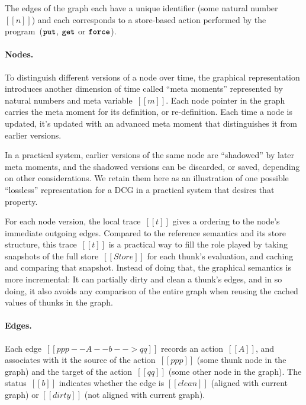\documentclass[11pt]{article}
\renewcommand{\ottkw}[1]{\textbf{\texttt{#1}}}
\begin{document}
The edges of the graph each have a unique identifier (some natural number~$[[n]]$) and each corresponds to a store-based action performed by the program~($\ottkw{put}$, $\ottkw{get}$ or $\ottkw{force}$).

\ottgrammartabular{
  \ottGraph
}


\ottgrammartabular{
  \ottppp
}

\paragraph{Nodes.}
To distinguish different versions of a node over time,
the graphical representation introduces another dimension of time called ``meta moments''
represented by natural numbers and meta variable~$[[m]]$.
%
Each node pointer in the graph carries the meta moment for its definition, or re-definition.
%
Each time a node is updated, it's updated with an advanced meta moment that distinguishes it from earlier versions.

In a practical system, earlier versions of the same node are
``shadowed'' by later meta moments, and the shadowed versions can be
discarded, or saved, depending on other considerations.
%
We retain them here as an illustration of one possible ``lossless'' representation for a DCG in a practical system that desires that property.

For each node version, the local trace~$[[t]]$ gives a ordering to the node's immediate outgoing edges.
%
Compared to the reference semantics and its store structure, this
trace~$[[t]]$ is a practical way to fill the role played by taking
snapshots of the full store~$[[Store]]$ for each thunk's evaluation,
and caching and comparing that snapshot.
%
Instead of doing that, the graphical semantics is more incremental:
It can partially dirty and clean a thunk's edges, and in so doing, it also avoids any comparison of the entire graph
when reusing the cached values of thunks in the graph.

\ottgrammartabular{
  \ottnode
  \\
  \ottcache
  \\
  \ottt
}

\paragraph{Edges.}
Each edge~$[[ppp --A--b--> qq]]$ records an action~$[[A]]$, and
associates with it the source of the action~$[[ppp]]$ (some thunk node
in the graph) and the target of the action~$[[qq]]$ (some other node
in the graph).
%
The status~$[[b]]$ indicates whether the edge is $[[clean]]$ (aligned
with current graph) or $[[dirty]]$ (not aligned with current graph).
\end{document}
